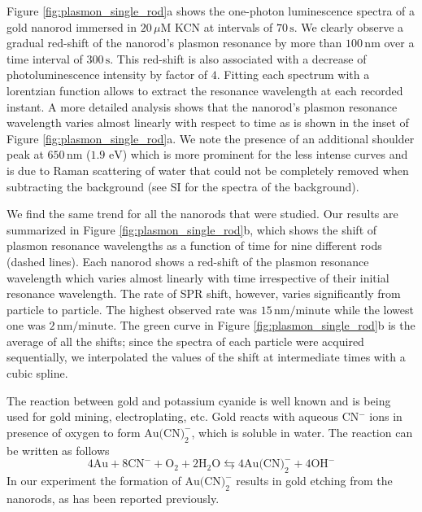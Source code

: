 \documentclass[a4paper,oneside,onecolumn]{article}
\newcommand{\nm}{\ensuremath{\,\textrm{nm}}}
\newcommand{\eV}{\ensuremath{\,\textrm{eV}}}
\newcommand{\uM}{\ensuremath{\,\mu\textrm{M}}}
\begin{document}
Figure \ref{fig:plasmon_single_rod}a shows the one-photon luminescence spectra
of a gold nanorod immersed in $20\uM$ KCN at intervals of $70\,\text{s}$. We
clearly observe a gradual red-shift of the nanorod's plasmon resonance by more
than $100\nm$ over a time interval of $300\,\text{s}$. This red-shift is also
associated with a decrease of photoluminescence intensity by factor of $4$.
Fitting each spectrum with a lorentzian function allows to extract the resonance
wavelength at each recorded instant. A more detailed analysis shows that the
nanorod's plasmon resonance wavelength varies almost linearly with respect to
time as is shown in the inset of Figure \ref{fig:plasmon_single_rod}a. We note the presence of an
additional shoulder peak at $650\nm$ ($1.9\,\eV$) which is more prominent for
the less intense curves and is due to Raman scattering of water\cite{Snow1985}
that could not be completely removed when subtracting the background (see SI for
the spectra of the background).

We find the same trend for all the nanorods that were studied. Our results are
summarized in Figure \ref{fig:plasmon_single_rod}b, which shows the shift of
plasmon resonance wavelengths as a function of time for nine different rods
(dashed lines). Each nanorod shows a red-shift of the plasmon resonance
wavelength which varies almost linearly with time irrespective of their
initial resonance wavelength. The rate of SPR shift, however, varies significantly
from particle to particle. The highest observed rate was $15\nm/\textrm{minute}$
while the lowest one was $2\nm/\textrm{minute}$. The green curve in Figure
\ref{fig:plasmon_single_rod}b is the average of all the shifts; since the
spectra of each particle were acquired sequentially, we interpolated the
values of the shift at intermediate times with a cubic spline.

The reaction between gold and potassium cyanide is well known and is being used
for gold mining, electroplating, etc. Gold reacts with
aqueous CN$^-$ ions in presence of oxygen to form $\textrm{Au(CN)}_2^-$, which
is soluble in water. The reaction can be written as follows
\begin{equation*}
4\textrm{Au} + 8\textrm{CN}^-+\textrm{O}_2 + 2\textrm{H}_2\textrm{O}
\leftrightarrows 4\textrm{Au(CN)}_2^-+4\textrm{OH}^- \end{equation*}
In our experiment the formation of $\textrm{Au(CN)}_2^-$ results in gold etching from the nanorods, as has been reported previously\cite{Jana2002}.
\end{document}
